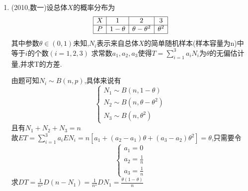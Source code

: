 \documentclass[12pt, a4paper, oneside, UTF8]{ctexbook}
\begin{document}
\begin{enumerate}[label=\arabic*.,start=4]
    \item (2010,数一)设总体$X$的概率分布为 
    \[
    \begin{array}{|c|c|c|c|}
        \hline
        X & 1 & 2 & 3 \\
        \hline
        P & 1-\theta & \theta - \theta^2 & \theta^2 \\
        \hline
    \end{array}
    \]
    其中参数$\theta\in(0,1)$未知,$N_i$表示来自总体$X$的简单随机样本(样本容量为n)中等于$i$的个数$(i=1,2,3)$
    求常数$a_1,a_2,a_3$使得$T=\sum_{i=1}^{3}a_iN_i$为$\theta$的无偏估计量,并求T的方差.
    \begin{solution}
        由题可知$N_i\sim B(n,p)$,具体来说有
        \[
        \begin{cases}
            N_1\sim B(n, 1-\theta) \\
            N_2\sim B(n, \theta-\theta^2)\\
            N_3\sim B(n, \theta^2)
        \end{cases}
        \]且有$N_1+N_2+N_3=n$ \\
        故$ET=\sum_{i=1}^{3}a_iEN_i=n\left[a_1+(a_2-a_1)\theta+(a_3-a_2)\theta^2\right]=\theta$,只需要令
        \[
        \begin{cases}
            a_1 = 0\\
            a_2 = \frac{1}{n} \\
            a_3 = \frac{1}{n}
        \end{cases}
        \]
        求$DT=\frac{1}{n^2}D(n-N_1)=\frac{1}{n^2}DN_1=\frac{\theta(1-\theta)}{n}$
    \end{solution}
\end{enumerate}
\end{document}

